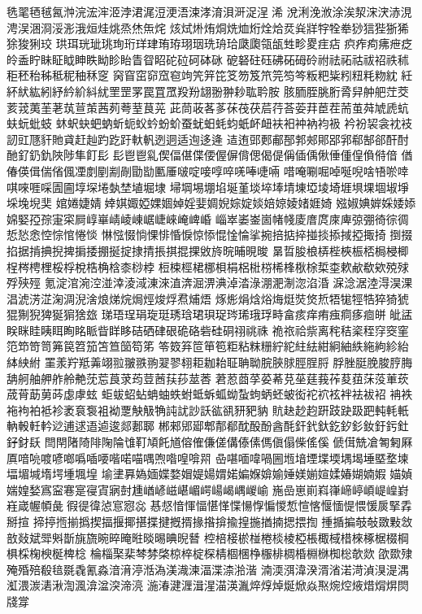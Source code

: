 毨毣毢毧氥浺浣浤浶洍浡涒浘浢浭浯涑涍淯浿涆浞浧浠
涗浰浼浟涂涘洯浨涋浾涀涄洖涃浻浽浵涐烜烓烑烝烋缹烢
烗烒烞烠烔烍烅烆烇烚烎烡牂牸牷牶猀狺狴狾狶狳狻猁珓
珙珥珖玼珧珣珩珜珒珛珔珝珚珗珘珨瓞瓟瓴瓵甡畛畟疰痁
疻痄痀疿疶疺皊盉眝眛眐眓眒眣眑眕眙眚眢眧砣砬砢砵砯
砨砮砫砡砩砳砪砱祔祛祏祜祓祒祑秫秬秠秮秭秪秜秞秝窆
窉窅窋窌窊窇竘笐笄笓笅笏笈笊笎笉笒粄粑粊粌粈粍粅紞
紝紑紎紘紖紓紟紒紏紌罜罡罞罠罝罛羖羒翃翂翀耖耾耹胺
胲胹胵脁胻脀舁舯舥茳茭荄茙荑茥荖茿荁茦茜茢荂荎茛茪
茈茼荍茖茤茠茷茯茩荇荅荌荓茞茬荋茧荈虓虒蚢蚨蚖蚍蚑
蚞蚇蚗蚆蚋蚚蚅蚥蚙蚡蚧蚕蚘蚎蚝蚐蚔衃衄衭衵衶衲袀衱
衿衯袃衾衴衼訒豇豗豻貤貣赶赸趵趷趶軑軓迾迵适迿迻逄
迼迶郖郠郙郚郣郟郥郘郛郗郜郤酐酎酏釕釢釚陜陟隼飣⾽
髟⾿鬯乿偰偪偡偞偠偓偋偝偲偈偍偁偛偊偢倕偅偟偩偫偣
偤偆偀偮偳偗偑凐剫剭剬剮勖勓匭厜啵啶唼啍啐唴唪啑啢
唶唵唰啒啅唌唲啥啎唹啈唭唻啀啋圊圇埻堔埢埶埜埴堀埭
埽堈埸堋埳埏堇埮埣埲埥埬埡堎埼堐埧堁堌埱埩埰堍堄奜
婠婘婕婧婞娸娵婭婐婟婥婬婓婤婗婃婝婒婄婛婈媎娾婍
娹婌婰婩婇婑婖婂婜孲孮寁寀屙崞崋崝崚崠崌崨崍崦崥崏
崰崒崣崟崮帾帴庱庴庹庲庳弶弸徛徖徟悊悐悆悾悰悺惓惔
惏惤惙惝惈悱惛悷惊悿惃惍惀挲捥掊掂捽掽掞掭掝掗掫掎
捯掇掐据掯捵掜捭掮捼掤挻掟捸掅掁掑掍捰敓旍晥晡晛晙
晜晢朘桹梇梐梜桭桮梮梫楖桯梣梬梩桵桴梲梏桷梒桼桫桲
梪梀桱桾梛梖梋梠梉梤桸桻梑梌梊桽欶欳欷欸殑殏殍殎殌
氪淀涫涴涳湴涬淩淢涷淶淔渀淈淠淟淖涾淥淜淝淛淴淊涽
淭淰涺淕淂淏淉淐淲淓淽淗淍淣涻烺焍烷焗烴焌烰焄烳焐
烼烿焆焓焀烸烶焋焂焎牾牻牼牿猝猗猇猑猘猊猈狿猏猞玈
珶珸珵琄琁珽琇琀珺珼珿琌琋珴琈畤畣痎痒痏痋痌痑痐皏
皉盓眹眯眭眱眲眴眳眽眥眻眵硈硒硉硍硊硌砦硅硐祤祧祩
祪祣祫祡离秺秸秶秷窏窔窐笵笻笴笥笰笢笤笳笘笪笝笱笫
笭笯笲笸笚笣粔粘粖粣紵紽紸紶紺絅紬紩絁絇紾紿絊紻紨
罣羕羜羝羛翊翋翍翐翑翇翏翉耟耞耛聇聃聈脘脥脙脛脭脟
脬脞脡脕脧脝脢舑舸舳舺舴舲艴莐莣莨莍荺荳莤荴莏莁莕
莙荵莔莩荽莃莌莝莛莪莋荾莥莯莈莗莰荿莦莇莮荶虙虖蚿
蚷蛂蛁蛅蚺蚰蛈蚹蚳蚸蛌蚴蚻蚼蛃蚽蚾衒袉袕袨袢袪袚袑
袡袟袘袧袙袛袗袤袬袌袓袎覂觖觙觕訰訧訬訞谹谻豜豝豽
貥赽赻赹趼跂趹趿跁軘軞軝軜軗軠軡逤逋逑逜逌逡郯郪郰
郴郲郳郔郫郬郩酖酘酚酓酕釬釴釱釳釸釤釹釪釫釷釨釮镺
閆閈陼陭陫陱陯隿靪頄飥馗傛傕傔傞傋傣傃傌傎傝偨傜傒
傂傇兟凔匒匑厤厧喑喨喥喭啷噅喢喓喈喏喵喁喣喒喤啽喌
喦啿喕喡喎圌堩堷堙堞堧堣堨埵塈堥堜堛堳堿堶堮堹堸堭
堬堻奡媯媔媟婺媢媞婸媦婼媥媬媕媮娷媄媊媗媃媋媩婻婽
媌媜媏媓媝寪寍寋寔寑寊寎尌尰崷嵃嵫嵁嵋崿崵嵑嵎嵕崳
崺嵒崽崱嵙嵂崹嵉崸崼崲崶嵀嵅幄幁彘徦徥徫惉悹惌惢
惎惄愔惲愊愖愅惵愓惸惼惾惁愃愘愝愐惿愄愋扊掔掱掰揎
揥揨揯揃撝揳揊揠揶揕揲揵摡揟掾揝揜揄揘揓揂揇揌揋揈
揰揗揙攲敧敪敤敜敨敥斌斝斞斮旐旒晼晬晻暀晱晹晪晲朁
椌棓椄棜椪棬棪棱椏棖棷棫棤棶椓椐棳棡椇棌椈楰梴椑棯
棆椔棸棐棽棼棨椋椊椗棎棈棝棞棦棴棑椆棔棩椕椥棇欹欻
欿欼殔殗殙殕殽毰毲毳氰淼湆湇渟湉溈渼渽湅湢渫渿湁湝
湳渜渳湋湀湑渻渃渮湞湨湜湡渱渨湠湱湫渹渢渰湓湥渧湸
湤湷湕湹湒湦渵渶湚焠焞焯烻焮焱焣焥焢焲焟焨焺焛牋牚

